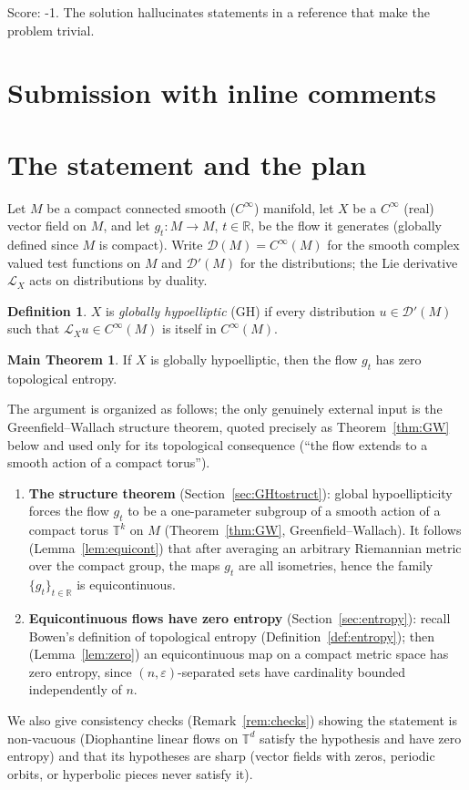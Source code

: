 \documentclass[11pt]{article}
\theoremstyle{definition}
\newtheorem{definition}[theorem]{Definition}
\newtheorem*{mainthm}{Main Theorem}
\newcommand{\calL}{\mathcal{L}}
\newcommand{\TT}{\mathbb{T}}
\newcommand{\RR}{\mathbb{R}}
\begin{document}
\noindent Score: -1.
The solution hallucinates statements in a reference that make the problem trivial.

\newpage
\section{Submission with inline comments}


\section{The statement and the plan}\label{sec:intro}

Let $M$ be a compact connected smooth ($C^\infty$) manifold, let $X$ be a
$C^\infty$ (real) vector field on $M$, and let $g_t : M \to M$,
$t \in \RR$, be the flow it generates (globally defined since $M$ is
compact). Write $\mathcal{D}(M) = C^\infty(M)$ for the smooth complex
valued test functions on $M$ and $\mathcal{D}'(M)$ for the distributions;
the Lie derivative $\calL_X$ acts on distributions by duality.

\begin{definition}\label{def:GH}
$X$ is \emph{globally hypoelliptic} (GH) if every distribution
$u \in \mathcal{D}'(M)$ such that $\calL_X u \in C^\infty(M)$ is itself in
$C^\infty(M)$.
\end{definition}

\begin{mainthm}
If $X$ is globally hypoelliptic, then the flow $g_t$ has zero topological
entropy.
\end{mainthm}

The argument is organized as follows; the only genuinely external input is
the Greenfield--Wallach structure theorem, quoted precisely as
Theorem~\ref{thm:GW} below and used only for its topological consequence
(``the flow extends to a smooth action of a compact torus'').
\begin{enumerate}[label=(\arabic*), leftmargin=2.5em]
  \item \textbf{The structure theorem} (Section~\ref{sec:GHtostruct}):
        global hypoellipticity forces the flow $g_t$ to be a
        one-parameter subgroup of a smooth action of a compact torus
        $\TT^k$ on $M$ (Theorem~\ref{thm:GW}, Greenfield--Wallach).
        It follows (Lemma~\ref{lem:equicont}) that after averaging an
        arbitrary Riemannian metric over the compact group, the maps
        $g_t$ are all isometries, hence the family
        $\{g_t\}_{t \in \RR}$ is equicontinuous.
  \item \textbf{Equicontinuous flows have zero entropy}
        (Section~\ref{sec:entropy}): recall Bowen's definition of
        topological entropy (Definition~\ref{def:entropy}); then
        (Lemma~\ref{lem:zero}) an equicontinuous map on a compact metric
        space has zero entropy, since $(n,\varepsilon)$-separated sets
        have cardinality bounded independently of $n$.
\end{enumerate}
We also give consistency checks (Remark~\ref{rem:checks}) showing the
statement is non-vacuous (Diophantine linear flows on $\TT^d$ satisfy the
hypothesis and have zero entropy) and that its hypotheses are sharp
(vector fields with zeros, periodic orbits, or hyperbolic pieces never
satisfy it).
\end{document}
